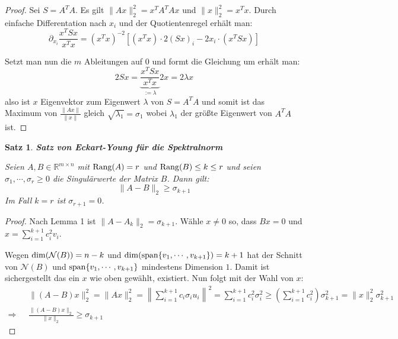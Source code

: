 \documentclass{article}
\newcommand{\R}[0]{\mathbb{R}}
\theoremstyle{plain}
\newtheorem{thm}{Satz}[section]
\theoremstyle{definition}
\begin{document}
\begin{proof}\cite[S. 62f.]{strang2019linear}
    Sei $S = A^TA$. Es gilt $\lVert Ax \rVert_2^2 = x^TA^TAx$ und $\lVert x \rVert_2^2 = x^Tx$.
    Durch einfache Differentation nach $x_i$ und der Quotientenregel erhält man:
    \begin{equation}
        \partial_{x_i}\frac{x^TSx}{x^Tx} = (x^Tx)^{-2}\left[ (x^Tx) \cdot 2(Sx)_i - 2x_i \cdot (x^TSx) \right]
    \end{equation}

    Setzt man nun die $m$ Ableitungen auf $0$ und formt die Gleichung um erhält man:
    \begin{equation}
        2Sx = \underbrace{\frac{x^TSx}{x^Tx}}_{:= \lambda} 2x = 2\lambda x
    \end{equation}
    also ist $x$ Eigenvektor zum Eigenwert $\lambda$ von $S = A^TA$ und
    somit ist das Maximum von $\frac{\lVert Ax \rVert}{\lVert x \rVert}$ gleich $\sqrt{\lambda_1} = \sigma_1$ wobei $\lambda_1$ der größte Eigenwert von $A^TA$ ist.
\end{proof}

\begin{thm} \textbf{Satz von Eckart-Young für die Spektralnorm}

    Seien $A, B \in \R^{m \times n}$ mit ${\rm Rang}(A) = r$ und ${\rm Rang}(B) \leq k \leq r$ und seien $\sigma_1, \cdots, \sigma_r \geq 0$ die Singulärwerte der Matrix $B$. Dann gilt:
    \begin{equation}
        \lVert A - B \rVert_2 \geq \sigma_{k+1}
    \end{equation}
    Im Fall $k = r$ ist $\sigma_{r+1} = 0$.
\end{thm}

\begin{proof} \cite[S. 72f.]{strang2019linear}
    Nach Lemma 1 ist $\lVert A - A_k \rVert_2 = \sigma_{k+1}$. Wähle $x \neq 0$ so, dass $Bx = 0$ und $x = \sum\limits_{i=1}^{k+1} c_i^2v_i$.

    Wegen ${\rm dim}(\mathcal{N}(B)) = n - k$ und ${\rm dim}({\rm span}\{v_1, \cdots, v_{k+1}\}) = k + 1$ hat der Schnitt von $\mathcal{N}(B)$ und ${\rm span}\{v_1, \cdots, v_{k+1}\}$ mindestens Dimension $1$. 
    Damit ist sichergestellt das ein $x$ wie oben gewählt, existiert. Nun folgt mit der Wahl von $x$:
    \begin{align*}
        &\lVert(A-B)x\rVert_2^2 = \lVert Ax \rVert^2_2 = \left\lVert \sum\limits_{i=1}^{k+1} c_i\sigma_i u_i \right\rVert^2 = \sum\limits_{i=1}^{k+1}c_i^2\sigma_i^2 \geq \left(\sum\limits_{i=1}^{k+1}c_i^2\right)\sigma_{k+1}^2 = \lVert x \rVert_2^2 \sigma_{k+1}^2 \\
    \Rightarrow \:\:\: &\frac{\lVert (A - B)x \rVert_2}{\lVert x \rVert_2} \geq \sigma_{k+1}
    \end{align*}
\end{proof}
\end{document}
